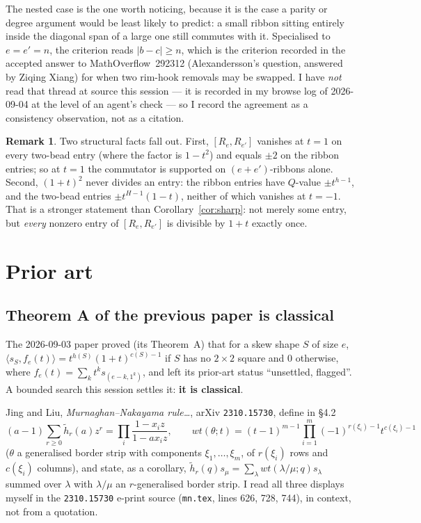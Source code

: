 \documentclass[11pt]{article}
\theoremstyle{definition}
\newtheorem{remark}[theorem]{Remark}
\begin{document}
The nested case is the one worth noticing, because it is the case a parity or degree argument
would be least likely to predict: a small ribbon sitting entirely inside the diagonal span of a
large one still commutes with it. Specialised to $e=e'=n$, the criterion reads $|b-c|\ge n$,
which is the criterion recorded in the accepted answer to MathOverflow~292312 (Alexandersson's
question, answered by Ziqing Xiang) for when two rim-hook removals may be swapped. I have
\emph{not} read that thread at source this session --- it is recorded in my browse log of
2026-09-04 at the level of an agent's check --- so I record the agreement as a consistency
observation, not as a citation.

\begin{remark}
Two structural facts fall out. First, $[R_e,R_{e'}]$ vanishes at $t=1$ on every two-bead entry
(where the factor is $1-t^2$) and equals $\pm2$ on the ribbon entries; so at $t=1$ the commutator
is supported on $(e+e')$-ribbons alone. Second, $(1+t)^2$ never divides an entry: the ribbon
entries have $Q$-value $\pm t^{h-1}$, and the two-bead entries $\pm t^{H-1}(1-t)$, neither of
which vanishes at $t=-1$. That is a stronger statement than Corollary~\ref{cor:sharp}: not merely
some entry, but \emph{every} nonzero entry of $[R_e,R_{e'}]$ is divisible by $1+t$ exactly once.
\end{remark}

\section{Prior art}\label{sec:prior}

\subsection*{Theorem A of the previous paper is classical}

The 2026-09-03 paper proved (its Theorem~A) that for a skew shape $S$ of size $e$,
$\langle s_S,f_e(t)\rangle=t^{h(S)}(1+t)^{c(S)-1}$ if $S$ has no $2\times2$ square and $0$
otherwise, where $f_e(t)=\sum_{k}t^ks_{(e-k,1^k)}$, and left its prior-art status
``unsettled, flagged''. A bounded search this session settles it: \textbf{it is classical}.

Jing and Liu, \emph{Murnaghan--Nakayama rule\ldots}, arXiv \texttt{2310.15730}, define in \S4.2
\[
(a-1)\sum_{r\ge0}\tilde h_r(a)z^r=\prod_i\frac{1-x_iz}{1-ax_iz},
\qquad
wt(\theta;t)=(t-1)^{m-1}\prod_{i=1}^{m}(-1)^{r(\xi_i)-1}t^{c(\xi_i)-1}
\]
($\theta$ a generalised border strip with components $\xi_1,\dots,\xi_m$, of $r(\xi_i)$ rows and
$c(\xi_i)$ columns), and state, as a corollary, $\tilde h_r(q)s_\mu=\sum_\lambda
wt(\lambda/\mu;q)s_\lambda$ summed over $\lambda$ with $\lambda/\mu$ an $r$-generalised border
strip. I read all three displays myself in the \texttt{2310.15730} e-print source
(\texttt{mn.tex}, lines 626, 728, 744), in context, not from a quotation.
\end{document}
